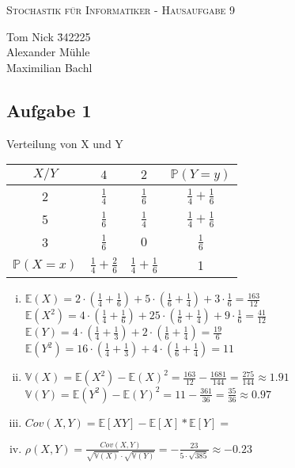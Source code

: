 \documentclass[10pt,a4paper,parskip=half]{scrartcl}
\begin{document}
\begin{center}
\textsc{\Large{Stochastik für Informatiker - Hausaufgabe 9}} \\
\end{center}
\begin{tabbing}
Tom Nick \hspace{1.4cm}\= 342225\\
Alexander Mühle\\
Maximilian Bachl
\end{tabbing}
\subsection*{Aufgabe 1}
Verteilung von X und Y
\begin{tabular}{c | c c  | c}
$X/Y$ & $4$ & $2$ & $\mathbb{P}(Y=y) $\\ \hline
2 & $\frac{1}{4}$ & $\frac{1}{6}$ & $\frac{1}{4} + \frac{1}{6}$ \\
5 & $\frac{1}{6}$ & $\frac{1}{4}$ & $\frac{1}{4} + \frac{1}{6}$ \\
3 & $\frac{1}{6}$ & $0$ & $\frac{1}{6}$ \\ \hline
$\mathbb{P}(X=x)$ & $\frac{1}{4} + \frac{2}{6}$ & $\frac{1}{4} + \frac{1}{6}$ & 1
\end{tabular}
\begin{enumerate}[(i)]
\item
$\mathbb{E}(X) = 2 \cdot (\frac{1}{4}+\frac{1}{6}) + 5 \cdot (\frac{1}{6} + \frac{1}{4}) + 3 \cdot \frac{1}{6} = \frac{163}{12}$ \\
$\mathbb{E}(X^2) = 4 \cdot (\frac{1}{4}+\frac{1}{6}) + 25 \cdot (\frac{1}{6} + \frac{1}{4}) + 9 \cdot \frac{1}{6} = \frac{41}{12}$ \\
$\mathbb{E}(Y) = 4 \cdot (\frac{1}{4}+\frac{1}{3}) + 2 \cdot (\frac{1}{6} + \frac{1}{4}) = \frac{19}{6}$ \\
$\mathbb{E}(Y^2) = 16 \cdot (\frac{1}{4}+\frac{1}{3}) + 4 \cdot (\frac{1}{6} + \frac{1}{4}) = 11$ \\
\item
$\mathbb{V}(X) = \mathbb{E}(X^2) - \mathbb{E}(X)^2 = \frac{163}{12} - \frac{1681}{144} = \frac{275}{144} \approx 1.91$ \\
$\mathbb{V}(Y) = \mathbb{E}(Y^2) - \mathbb{E}(Y)^2 = 11 - \frac{361}{36} = \frac{35}{36} \approx 0.97$ \\
\item
$Cov(X,Y) = \mathbb{E}[XY] - \mathbb{E}[X] * \mathbb{E}[Y] = $ \\
\item
$\rho (X,Y) = \frac{Cov(X,Y)}{\sqrt{\mathbb{V}(X)} \cdot \sqrt{\mathbb{V}(Y)}} = -\frac{23}{5 \cdot \sqrt{385}} \approx - 0.23 $ \\
\end{enumerate}
\end{document}
